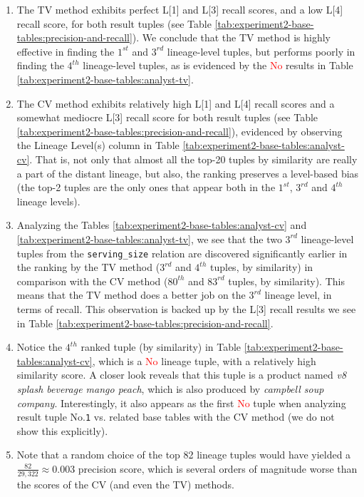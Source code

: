 \begin{experiment-withrun}
\begin{enumerate}
    \item The TV method exhibits perfect L[1] and L[3] recall scores, and a low L[4] recall score, for both result tuples (see Table \ref{tab:experiment2-base-tables:precision-and-recall}). We conclude that the TV method is highly effective in finding the $1^{st}$ and $3^{rd}$ lineage-level tuples, but performs poorly in finding the $4^{th}$ lineage-level tuples, as is evidenced by the \textcolor{Red}{No} results in Table \ref{tab:experiment2-base-tables:analyst-tv}.
    \item The CV method exhibits relatively high L[1] and L[4] recall scores and a somewhat mediocre L[3] recall score for both result tuples (see Table \ref{tab:experiment2-base-tables:precision-and-recall}), evidenced by observing the Lineage Level(s) column in Table \ref{tab:experiment2-base-tables:analyst-cv}. That is, not only that almost all the top-20 tuples by similarity are really a part of the distant lineage, but also, the ranking preserves a level-based bias (the top-2 tuples are the only ones that appear both in the $1^{st}$, $3^{rd}$ and $4^{th}$ lineage levels).
    \item Analyzing the Tables \ref{tab:experiment2-base-tables:analyst-cv} and \ref{tab:experiment2-base-tables:analyst-tv}, we see that the two $3^{rd}$ lineage-level tuples from the \texttt{serving\_size} relation are discovered significantly earlier in the ranking by the TV method ($3^{rd}$ and $4^{th}$ tuples, by similarity) in comparison with the CV method ($80^{th}$ and $83^{rd}$ tuples, by similarity). This means that the TV method does a better job on the $3^{rd}$ lineage level, in terms of recall. This observation is backed up by the L[3] recall results we see in Table \ref{tab:experiment2-base-tables:precision-and-recall}.
    \item Notice the $4^{th}$ ranked tuple (by similarity) in Table \ref{tab:experiment2-base-tables:analyst-cv}, which is a \textcolor{Red}{No} lineage tuple, with a relatively high similarity score. A closer look reveals that this tuple is a product named \textit{v8 splash beverage mango peach}, which is also produced by \textit{campbell soup company}. Interestingly, it also appears as the first \textcolor{Red}{No} tuple when analyzing result tuple No.\texttt{1} vs. related base tables with the CV method (we do not show this explicitly).
    \item Note that a random choice of the top 82 lineage tuples would have yielded a $\frac{82}{29,322} \approx 0.003$ precision score, which is several orders of magnitude worse than the scores of the CV (and even the TV) methods. 
\end{enumerate}


\end{experiment-withrun}
